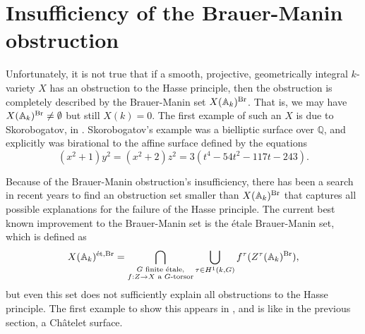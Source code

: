 \documentclass[12pt,twoside]{reedthesis}
\theoremstyle{plain}
\theoremstyle{definition}
\theoremstyle{remark}
\newcommand{\Affine}{\mathbb{A}}
\newcommand{\QQ}{\mathbb{Q}}
\newcommand{\Br}{\operatorname{Br}}
\newcommand{\adele}{\reflectbox{$\Affine$}}
\begin{document}
\section{Insufficiency of the Brauer-Manin obstruction}
Unfortunately, it is not true that if a smooth, projective, geometrically integral $k$-variety $X$ has an obstruction to the Hasse principle, then the obstruction is completely described by the Brauer-Manin set $X(\adele_k)^{\Br}$. That is, we may have $X(\adele_k)^{\Br}\neq\emptyset$ but still $X(k)=0$. The first example of such an $X$ is due to Skorobogatov, in \cite{skoEx}. Skorobogatov's example was a bielliptic surface over $\QQ$, and explicitly was birational to the affine surface defined by the equations
\[
(x^2+1)y^2=(x^2+2)z^2=3(t^4-54t^2-117t-243).
\]

Because of the Brauer-Manin obstruction's insufficiency, there has been a search in recent years to find an obstruction set smaller than $X(\adele_k)^{\Br}$ that captures all possible explanations for the failure of the Hasse principle. The current best known improvement to the Brauer-Manin set is the \'etale Brauer-Manin set, which is defined as
\[
X(\adele_k)^{\text{\'et},\Br}=\bigcap_{\substack{G \text{ finite \'etale,}\\ f:Z\to X\text{ a $G$-torsor}}}\bigcup_{\tau\in H^1(k,G)} f^\tau(Z^\tau(\adele_k)^{\Br}),
\]
but even this set does not sufficiently explain all obstructions to the Hasse principle. The first example to show this appears in \cite{poonenEtBrEx}, and is like in the previous section, a Ch\^atelet surface. 
\end{document}
